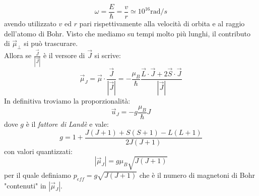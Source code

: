 \documentclass{book}
\begin{document}
     \begin{equation}
         \omega = \frac{E}{\hbar} = \frac{v}{r} \simeq 10^{16} \textrm{rad}/s
     \end{equation}
     avendo utilizzato $v$ ed $r$ pari rispettivamente alla velocità di orbita e al raggio dell'atomo di Bohr. Visto che mediamo su tempi molto più lunghi, il contributo di $\vec{\mu}_{\perp}$ si può trascurare.\\
     Allora se $\displaystyle \frac{\vec{J}}{|\vec{J}|}$ è il versore di $\vec{J}$ si scrive:
     \begin{equation}
         \vec{\mu}_{J} = \vec{\mu} \cdot \frac{\vec{J}}{|\vec{J}|} = -\frac{\mu_{B}}{\hbar} \frac{\vec{L} \cdot \vec{J} + 2\vec{S} \cdot \vec{J}}{|\vec{J}|}
     \end{equation}
     In definitiva troviamo la proporzionalità:
     \begin{equation}
         \vec{u}_{J} = -g \frac{\mu_{B}}{\hbar} J
     \end{equation}
     dove $g$ è il \textit{fattore di Landè} e vale:
     \begin{equation}
         g = 1 + \frac{J(J+1)+S(S+1)-L(L+1)}{2J(J+1)}
     \end{equation}
     con valori quantizzati:
     \begin{equation}
         |\vec{\mu}_{J}| = g \mu_{B} \sqrt{J(J+1)}
     \end{equation}
     per il quale definiamo $p_{eff} = g \sqrt{J(J+1)}$ che è il numero di magnetoni di Bohr "contenuti" in $|\vec{\mu}_{J}|$.\\ \\
\end{document}
